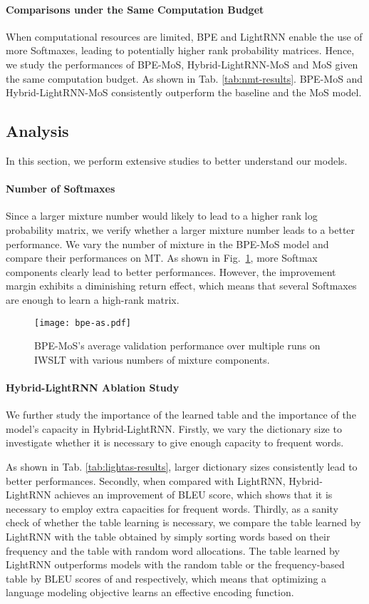 \documentclass[letterpaper]{article} \usepackage{aaai19}  \usepackage{times}  \usepackage{helvet}  \usepackage{courier}  \usepackage{url}  \usepackage{graphicx}  \frenchspacing  \usepackage{booktabs}
\begin{document}
\paragraph{Comparisons under the Same Computation Budget} When computational resources are limited, BPE and LightRNN enable the use of more Softmaxes, leading to potentially higher rank probability matrices. Hence, we study the performances of BPE-MoS, Hybrid-LightRNN-MoS and MoS given the same computation budget. As shown in Tab. \ref{tab:nmt-results}. BPE-MoS and Hybrid-LightRNN-MoS consistently outperform the baseline and the MoS model. 

\subsection{Analysis}
In this section, we perform extensive studies to better understand our models.

\paragraph{Number of Softmaxes} 
Since a larger mixture number would likely to lead to a higher rank log probability matrix, we verify whether a larger mixture number leads to a better performance.
We vary the number of mixture  in the BPE-MoS model and compare their performances on MT. 
As shown in Fig.~\ref{fig:bpe-as}, more Softmax components clearly lead to better performances. 
However, the improvement margin exhibits a diminishing return effect, which means that several Softmaxes are enough to learn a high-rank matrix.

\begin{figure}[t]
	\centering
	\texttt{[image: bpe-as.pdf]}
	\caption{BPE-MoS's average validation performance over multiple runs on IWSLT with various numbers of mixture components.}
	\label{fig:bpe-as}
\end{figure}

\paragraph{Hybrid-LightRNN Ablation Study}
We further study the importance of the learned table and the importance of the model's capacity in Hybrid-LightRNN.
Firstly, we vary the dictionary size to investigate whether it is necessary to give enough capacity to frequent words. 
   
As shown in Tab. \ref{tab:lightas-results}, larger dictionary sizes consistently lead to better performances. 
Secondly, when compared with LightRNN, Hybrid-LightRNN achieves an improvement of  BLEU score, which shows that it is necessary to employ extra capacities for frequent words.
Thirdly, as a sanity check of whether the table learning is necessary, we compare the table learned by LightRNN with the table obtained by simply sorting words based on their frequency and the table with random word allocations.
The table learned by LightRNN  outperforms models with the random table or the frequency-based table by BLEU scores of  and  respectively, which means that optimizing a language modeling objective learns an effective encoding function.
\end{document}
